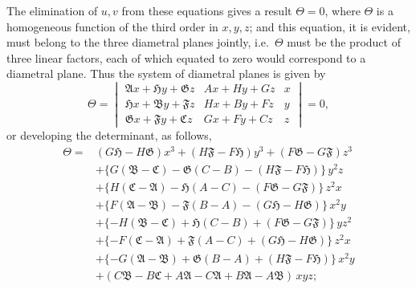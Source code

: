 \documentclass[11pt]{article}
\begin{document}
The elimination of $u, v$ from these equations gives a result $\Theta = 0$, where $\Theta$ is a homogeneous function of the third order in $x, y, z$; and this equation, it is evident, must belong to the three diametral planes jointly, i.e.\ $\Theta$ must be the product of three linear factors, each of which equated to zero would correspond to a diametral plane. Thus the system of diametral planes is given by
\[
\Theta = \begin{vmatrix} \mathfrak{A}x + \mathfrak{H}y + \mathfrak{G}z & Ax + Hy + Gz & x \\ \mathfrak{H}x + \mathfrak{B}y + \mathfrak{F}z & Hx + By + Fz & y \\ \mathfrak{G}x + \mathfrak{F}y + \mathfrak{C}z & Gx + Fy + Cz & z \end{vmatrix} = 0,
\]
or developing the determinant, as follows,
\begin{align*}
\Theta = {}& (G\mathfrak{H} - H\mathfrak{G})x^3 + (H\mathfrak{F} - F\mathfrak{H})y^3 + (F\mathfrak{G} - G\mathfrak{F})z^3\\
& + \{G(\mathfrak{B} - \mathfrak{C}) - \mathfrak{G}(C - B) - (H\mathfrak{F} - F\mathfrak{H})\}\,y^2 z\\
& + \{H(\mathfrak{C} - \mathfrak{A}) - \mathfrak{H}(A - C) - (F\mathfrak{G} - G\mathfrak{F})\}\,z^2 x\\
& + \{F(\mathfrak{A} - \mathfrak{B}) - \mathfrak{F}(B - A) - (G\mathfrak{H} - H\mathfrak{G})\}\,x^2 y\\
& + \{-H(\mathfrak{B} - \mathfrak{C}) + \mathfrak{H}(C - B) + (F\mathfrak{G} - G\mathfrak{F})\}\,y z^2\\
& + \{-F(\mathfrak{C} - \mathfrak{A}) + \mathfrak{F}(A - C) + (G\mathfrak{H} - H\mathfrak{G})\}\,z^2 x\\
& + \{-G(\mathfrak{A} - \mathfrak{B}) + \mathfrak{G}(B - A) + (H\mathfrak{F} - F\mathfrak{H})\}\,x^2 y\\
& + (C\mathfrak{B} - B\mathfrak{C} + A\mathfrak{A} - C\mathfrak{A} + B\mathfrak{A} - A\mathfrak{B})\,xyz;
\end{align*}

\newpage
\setcounter{page}{257}
\end{document}
